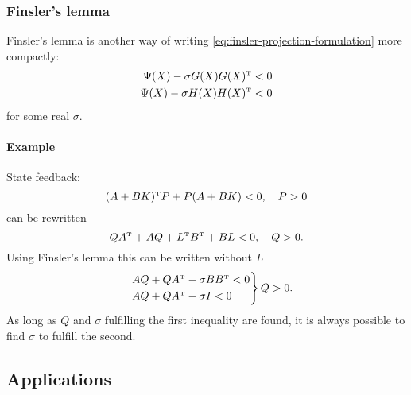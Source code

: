 \subsubsection{Finsler's lemma}
Finsler's lemma is another way of writing \eqref{eq:finsler-projection-formulation} more compactly:
%
\begin{equation}
  \begin{split}
    \Psi(X) - \sigma G(X) G(X)\tp &< 0 \\
    \Psi(X) - \sigma H(X) H(X)\tp &< 0
  \end{split}
\end{equation}
%
for some real $\sigma$.

\paragraph{Example} State feedback:
%
\begin{equation}
  (A + BK)\tp P + P(A + BK) < 0,\quad P > 0
\end{equation}
%
can be rewritten
%
\begin{equation}
  QA\tp + AQ + L\tp B\tp + BL < 0,\quad Q > 0.
\end{equation}
%
Using Finsler's lemma this can be written without $L$
%
\begin{equation}
  \begin{rcases}
    &AQ + QA\tp - \sigma BB\tp < 0 \\
    &AQ + QA\tp - \sigma I < 0
  \end{rcases} Q > 0.
\end{equation}
%
As long as $Q$ and $\sigma$ fulfilling the first inequality are found, it is always possible to find $\sigma$ to fulfill the second.

\subsection{Applications}

